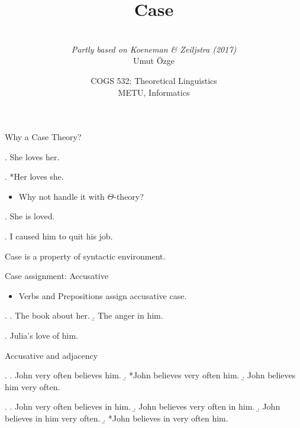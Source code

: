 \documentclass[ignorenonframetext,10pt,aspectratio=169]{beamer}
\title{Case}
\author{\  \\  {\it Partly based on Koeneman \& Zeiljstra (2017)} \\ \vspace{20pt} Umut \"Ozge\\  }
\date{COGS 532: Theoretical Linguistics\\ METU, Informatics}
\begin{document}
\begin{frame}\frametitle{}
\thispagestyle{empty}
\maketitle
\end{frame}

\begin{frame}[t,plain]{Why a Case Theory?}

\ex. She loves her. 

\ex. *Her loves she.

\pause

\begin{itemize}
\item Why not handle it with $\Theta$-theory? 
\end{itemize}
\pause
\ex. She is loved.

\ex. I caused him to quit his job.

\end{frame}

\begin{frame}[t,plain]{}
\vspace{50pt}
Case is a property of syntactic environment.
\end{frame}

\begin{frame}[t,plain]{Case assignment: Accusative}
\begin{itemize}
\item Verbs and Prepositions assign accusative case.
\end{itemize}

\ex. \a. The book about her.
\b. The anger in him.

\vspace{30pt}

\ex. Julia's love of him. 

\end{frame}

\begin{frame}[t,plain]{Accusative and adjacency}

\ex.
\a. John very often believes him.
\b. *John  believes very often him.
\b. John believes him very often. 

\ex.
\a. John very often believes in him.
\b. John believes very often in him.
\b. John believes in him very often. 
\b. *John believes in very often him. 

\end{frame}

\begin{frame}[t,plain]{}

\end{frame}
\end{document}
